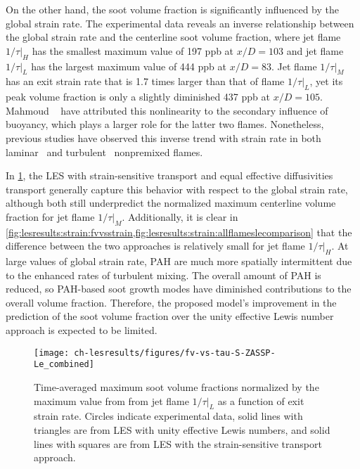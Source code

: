 On the other hand, the soot volume fraction is significantly influenced by the global strain rate. The experimental data reveals an inverse relationship between the global strain rate and the centerline soot volume fraction, where jet flame $1/\tau|_H$ has the smallest maximum value of 197 ppb at $x/D = 103$ and jet flame $1/\tau|_L$ has the largest maximum value of 444 ppb at $x/D = 83$. Jet flame $1/\tau|_M$ has an exit strain rate that is 1.7 times larger than that of flame $1/\tau|_L$, yet its peak volume fraction is only a slightly diminished 437 ppb at $x/D = 105$. Mahmoud \etal~\cite{mahmoud2017} have attributed this nonlinearity to the secondary influence of buoyancy, which plays a larger role for the latter two flames. Nonetheless, previous studies have observed this inverse trend with strain rate in both laminar~\cite{decroix2000,huijnen2010,wang2016433} and turbulent~\cite{kent1984,mahmoud2017} nonpremixed flames.

In \cref{fig:lesresults:strain:fvvsstrain}, the LES with strain-sensitive transport and equal effective diffusivities transport generally capture this behavior with respect to the global strain rate, although both still underpredict the normalized maximum centerline volume fraction for jet flame $1/\tau|_M$. Additionally, it is clear in \cref{fig:lesresults:strain:fvvsstrain,fig:lesresults:strain:allflameslecomparison} that the difference between the two approaches is relatively small for jet flame $1/\tau|_H$. At large values of global strain rate, PAH are much more spatially intermittent due to the enhanced rates of turbulent mixing. The overall amount of PAH is reduced, so PAH-based soot growth modes have diminished contributions to the overall volume fraction. Therefore, the proposed model's improvement in the prediction of the soot volume fraction over the unity effective Lewis number approach is expected to be limited.


\begin{figure}[htb]
  \centering
  \texttt{[image: ch-lesresults/figures/fv-vs-tau-S-ZASSP-Le\_combined]}
  \caption[Normalized Maximum \texorpdfstring{$\langle f_V \rangle$}{<fV>} Versus Exit Strain Rate]{Time-averaged maximum soot volume fractions normalized by the maximum value from from jet flame $1/\tau|_L$ as a function of exit strain rate. Circles indicate experimental data, solid lines with triangles are from LES with unity effective Lewis numbers, and solid lines with squares are from LES with the strain-sensitive transport approach.}
  \label{fig:lesresults:strain:fvvsstrain}
\end{figure}

